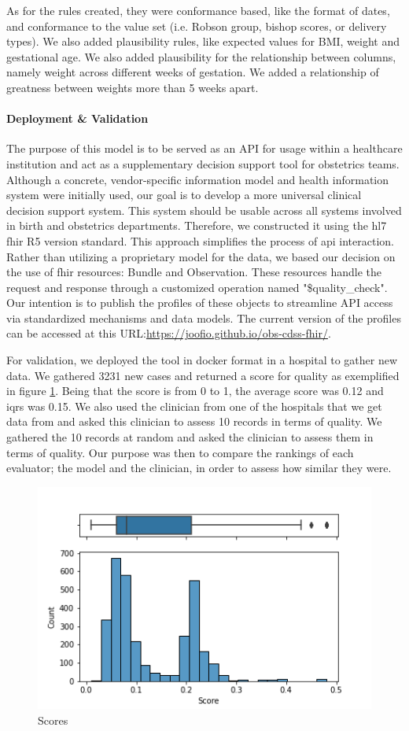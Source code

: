 As for the rules created, they were conformance based, like the format of dates, and conformance to the value set (i.e. Robson group, bishop scores, or delivery types). We also added plausibility rules, like expected values for BMI, weight and gestational age. We also added plausibility for the relationship between columns, namely weight across different weeks of gestation. We added a relationship of greatness between weights more than 5 weeks apart. 





\paragraph{Deployment \& Validation} 
The purpose of this model is to be served as an API for usage within a healthcare institution and act as a supplementary decision support tool for obstetrics teams. Although a concrete, vendor-specific information model and health information system were initially used, our goal is to develop a more universal clinical decision support system. This system should be usable across all systems involved in birth and obstetrics departments. Therefore, we constructed it using the \ac{hl7} \ac{fhir}  R5 version standard. This approach simplifies the process of \ac{api} interaction.
Rather than utilizing a proprietary model for the data, we based our decision on the use of \ac{fhir} resources: Bundle and Observation. These resources handle the request and response through a customized operation named "\$quality\_check". Our intention is to publish the profiles of these objects to streamline API access via standardized mechanisms and data models. The current version of the profiles can be accessed at this URL:\url{https://joofio.github.io/obs-cdss-fhir/}. 


For validation, we deployed the tool in docker format in a hospital to gather new data. We gathered 3231 new cases and returned a score for quality as exemplified in figure \ref{fig:scores}. Being that the score is from 0 to 1, the average score was 0.12 and \acp{iqr} was 0.15. We also used the clinician from one of the hospitals that we get data from and asked this clinician to assess 10 records in terms of quality. We gathered the 10 records at random and asked the clinician to assess them in terms of quality. Our purpose was then to compare the rankings of each evaluator; the model and the clinician, in order to assess how similar they were.



\begin{figure}[htbp]
\centering
\caption{Scores}\label{fig:scores} 
\includegraphics[scale=0.78]{figures/Scoring.png}
\end{figure}
